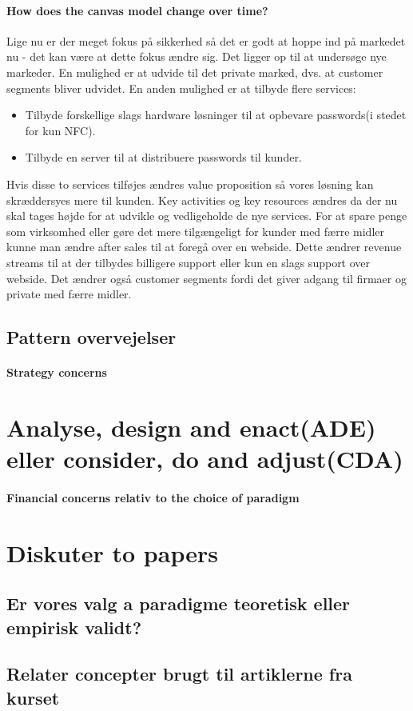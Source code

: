 \documentclass[a4paper]{article}
\begin{document}
\paragraph{How does the canvas model change over time?}
Lige nu er der meget fokus på sikkerhed så det er godt at hoppe ind på markedet nu - det kan være at dette fokus ændre sig.
Det ligger op til at undersøge nye markeder.
En mulighed er at udvide til det private marked, dvs. at customer segments bliver udvidet.
En anden mulighed er at tilbyde flere services:
\begin{itemize}
\item Tilbyde forskellige slags hardware løsninger til at opbevare passwords(i stedet for kun NFC).
\item Tilbyde en server til at distribuere passwords til kunder.
\end{itemize}
Hvis disse to services tilføjes ændres value proposition så vores løsning kan skræddersyes mere til kunden.
Key activities og key resources ændres da der nu skal tages højde for at udvikle og vedligeholde de nye services.
For at spare penge som virksomhed eller gøre det mere tilgængeligt for kunder med færre midler kunne man ændre after sales til at foregå over en webside.
Dette ændrer revenue streams til at der tilbydes billigere support eller kun en slags support over webside.
Det ændrer også customer segments fordi det giver adgang til firmaer og private med færre midler.

\subsection{Pattern overvejelser}


\paragraph{Strategy concerns}

\section{Analyse, design and enact(ADE) eller consider, do and adjust(CDA)}


\paragraph{Financial concerns relativ to the choice of paradigm}

\section{Diskuter to papers}
\subsection{Er vores valg a paradigme teoretisk eller empirisk validt?}
\subsection{Relater concepter brugt til artiklerne fra kurset}

\printbibliography[heading=bibintoc]
\end{document}
